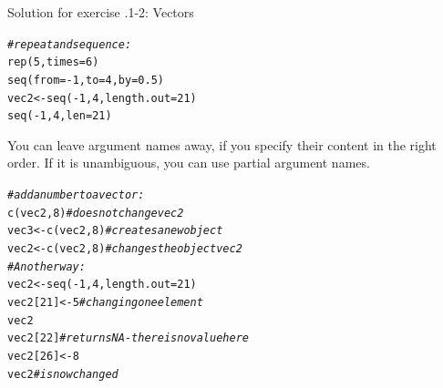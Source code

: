 \documentclass[xcolor=table,           xcolor=dvipsnames]{beamer}\usepackage[]{graphicx}\usepackage[]{color}
\makeatletter
\newcommand{\hlnum}[1]{\textcolor[rgb]{0,0,0}{#1}}
\newcommand{\hlcom}[1]{\textcolor[rgb]{0,0.392,0}{\textit{#1}}}
\newcommand{\hlopt}[1]{\textcolor[rgb]{0,0,0}{#1}}
\newcommand{\hlstd}[1]{\textcolor[rgb]{0,0,0}{#1}}
\newcommand{\hlkwb}[1]{\textcolor[rgb]{0,0,0}{#1}}
\newcommand{\hlkwc}[1]{\textcolor[rgb]{1,0,1}{#1}}
\newcommand{\hlkwd}[1]{\textcolor[rgb]{0,0,1}{#1}}
\newenvironment{kframe}{%
 \def\at@end@of@kframe{}%
 \ifinner\ifhmode%
  \def\at@end@of@kframe{\end{minipage}}%
  \begin{minipage}{\columnwidth}%
 \fi\fi%
 \def\FrameCommand##1{\hskip\@totalleftmargin \hskip-\fboxsep
 \colorbox{shadecolor}{##1}\hskip-\fboxsep
     \hskip-\linewidth \hskip-\@totalleftmargin \hskip\columnwidth}%
 \MakeFramed {\advance\hsize-\width
   \@totalleftmargin\z@ \linewidth\hsize
   \@setminipage}}%
 {\par\unskip\endMakeFramed%
 \at@end@of@kframe}
\newenvironment{knitrout}{}{} %
\newcounter{exercisecount}
\makeatother
\begin{document}

\begin{frame}[fragile]{Solution for exercise .1-2: Vectors}
\vspace{-0.5em}
\begin{knitrout}\small
{}\color{fgcolor}\begin{kframe}
\begin{alltt}
\hlcom{# repeat and sequence:}
\hlkwd{rep}\hlstd{(}\hlnum{5}\hlstd{,} \hlkwc{times}\hlstd{=}\hlnum{6}\hlstd{)}
\hlkwd{seq}\hlstd{(}\hlkwc{from}\hlstd{=}\hlopt{-}\hlnum{1}\hlstd{,} \hlkwc{to}\hlstd{=}\hlnum{4}\hlstd{,} \hlkwc{by}\hlstd{=}\hlnum{0.5}\hlstd{)}
\hlstd{vec2} \hlkwb{<-} \hlkwd{seq}\hlstd{(}\hlopt{-}\hlnum{1}\hlstd{,} \hlnum{4}\hlstd{,} \hlkwc{length.out}\hlstd{=}\hlnum{21}\hlstd{)}
\hlkwd{seq}\hlstd{(}\hlopt{-}\hlnum{1}\hlstd{,} \hlnum{4}\hlstd{,} \hlkwc{len}\hlstd{=}\hlnum{21}\hlstd{)}
\end{alltt}
\end{kframe}
\end{knitrout}
\vspace{-0.5em}
\small You can leave argument names away, if you specify their content in the right order.
If it is unambiguous, you can use partial argument names.
\normalsize
\vspace{-0.5em}
\onslide<+->
\begin{knitrout}\small
{}\color{fgcolor}\begin{kframe}
\begin{alltt}
\hlcom{# add a number to a vector:}
\hlkwd{c}\hlstd{(vec2,} \hlnum{8}\hlstd{)} \hlcom{# does not change vec2}
\hlstd{vec3} \hlkwb{<-} \hlkwd{c}\hlstd{(vec2,} \hlnum{8}\hlstd{)} \hlcom{# creates a new object}
\hlstd{vec2} \hlkwb{<-} \hlkwd{c}\hlstd{(vec2,} \hlnum{8}\hlstd{)} \hlcom{# changes the object vec2}
\hlcom{# Another way:}
\hlstd{vec2} \hlkwb{<-} \hlkwd{seq}\hlstd{(}\hlopt{-}\hlnum{1}\hlstd{,} \hlnum{4}\hlstd{,} \hlkwc{length.out}\hlstd{=}\hlnum{21}\hlstd{)}
\hlstd{vec2[}\hlnum{21}\hlstd{]} \hlkwb{<-} \hlnum{5} \hlcom{# changing one element}
\hlstd{vec2}
\hlstd{vec2[}\hlnum{22}\hlstd{]} \hlcom{# returns NA - there is no value here}
\hlstd{vec2[}\hlnum{26}\hlstd{]} \hlkwb{<-} \hlnum{8}
\hlstd{vec2} \hlcom{# is now changed}
\end{alltt}
\end{kframe}
\end{knitrout}
\end{frame}
\end{document}
